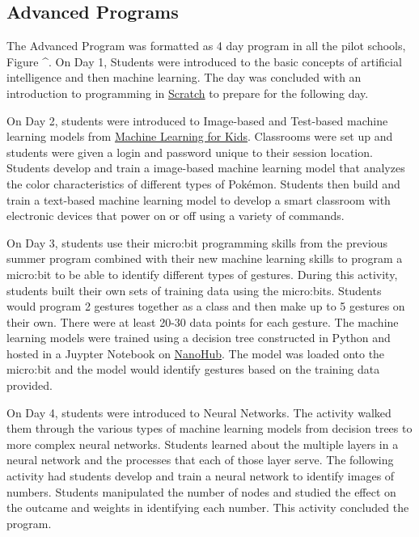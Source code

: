 \documentclass[
]{article}
\begin{document}
\hypertarget{advanced-programs}{%
\subsection{Advanced Programs}\label{advanced-programs}}

The Advanced Program was formatted as 4 day program in all the pilot
schools, Figure \^{}. On Day 1, Students were introduced to the basic
concepts of artificial intelligence and then machine learning. The day
was concluded with an introduction to programming in
\href{https://scratch.mit.edu/}{Scratch} to prepare for the following
day.

On Day 2, students were introduced to Image-based and Test-based machine
learning models from
\href{https://machinelearningforkids.co.uk/}{Machine Learning for Kids}.
Classrooms were set up and students were given a login and password
unique to their session location. Students develop and train a
image-based machine learning model that analyzes the color
characteristics of different types of Pokémon. Students then build and
train a text-based machine learning model to develop a smart classroom
with electronic devices that power on or off using a variety of
commands.

On Day 3, students use their micro:bit programming skills from the
previous summer program combined with their new machine learning skills
to program a micro:bit to be able to identify different types of
gestures. During this activity, students built their own sets of
training data using the micro:bits. Students would program 2 gestures
together as a class and then make up to 5 gestures on their own. There
were at least 20-30 data points for each gesture. The machine learning
models were trained using a decision tree constructed in Python and
hosted in a Juypter Notebook on \href{https://nanohub.org/}{NanoHub}.
The model was loaded onto the micro:bit and the model would identify
gestures based on the training data provided.

On Day 4, students were introduced to Neural Networks. The activity
walked them through the various types of machine learning models from
decision trees to more complex neural networks. Students learned about
the multiple layers in a neural network and the processes that each of
those layer serve. The following activity had students develop and train
a neural network to identify images of numbers. Students manipulated the
number of nodes and studied the effect on the outcame and weights in
identifying each number. This activity concluded the program.
\end{document}
